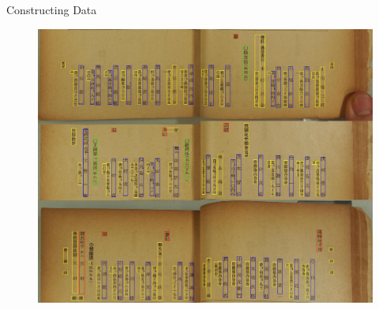 \begin{frame}{Constructing Data} 
    \begin{figure}
        \centering
        \includegraphics[height=0.8\textheight]{Data/Annotated_Page039.jpg}
        \label{fig:enter-label}
    \end{figure}
\end{frame}
